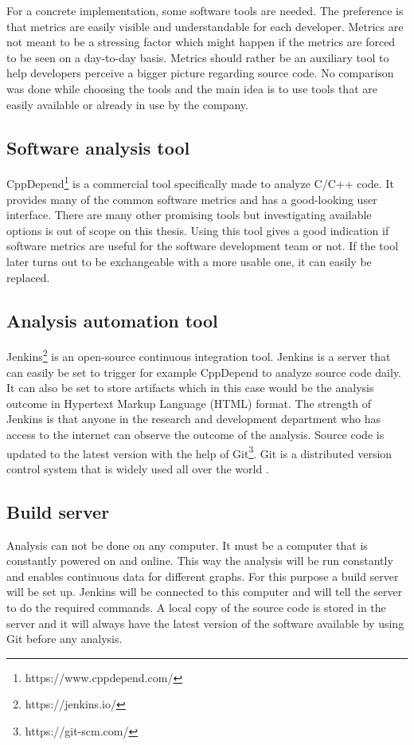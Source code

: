 For a concrete implementation, some software tools are needed. The preference is that metrics are easily visible and understandable for each developer. Metrics are not meant to be a stressing factor which might happen if the metrics are forced to be seen on a day-to-day basis. Metrics should rather be an auxiliary tool to help developers perceive a bigger picture regarding source code. No comparison was done while choosing the tools and the main idea is to use tools that are easily available or already in use by the company.

\subsection{Software analysis tool}
\label{chap:sofanatool}

CppDepend\footnote{https://www.cppdepend.com/} is a commercial tool specifically made to analyze C/C++ code. It provides many of the common software metrics and has a good-looking user interface. There are many other promising tools but investigating available options is out of scope on this thesis. Using this tool gives a good indication if software metrics are useful for the software development team or not. If the tool later turns out to be exchangeable with a more usable one, it can easily be replaced.

\subsection{Analysis automation tool}

Jenkins\footnote{https://jenkins.io/} is an open-source continuous integration tool. Jenkins is a server that can easily be set to trigger for example CppDepend to analyze source code daily. It can also be set to store artifacts which in this case would be the analysis outcome in Hypertext Markup Language (HTML) format.  The strength of Jenkins is that anyone in the research and development department who has access to the internet can observe the outcome of the analysis. Source code is updated to the latest version with the help of Git\footnote{https://git-scm.com/}. Git is a distributed version control system that is widely used all over the world \cite{gitsurvey}.

\subsection{Build server}

Analysis can not be done on any computer. It must be a computer that is constantly powered on and online. This way the analysis will be run constantly and enables continuous data for different graphs. For this purpose a build server will be set up. Jenkins will be connected to this computer and will tell the server to do the required commands. A local copy of the source code is stored in the server and it will always have the latest version of the software available by using Git before any analysis.

